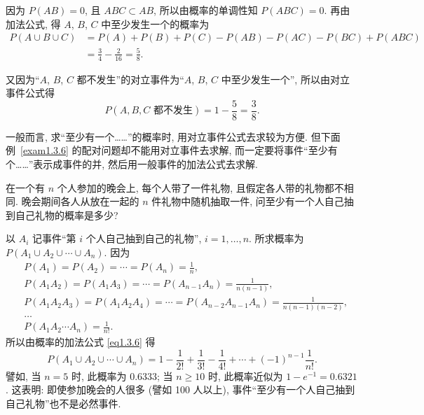 \begin{solution}
  因为 $P (AB) = 0$,
  且 $ABC \subset AB$,
  所以由概率的单调性知 $P (ABC) = 0$.
  再由加法公式,
  得 $A$, $B$, $C$ 中至少发生一个的概率为
  \begin{align*}
    P (A \cup B \cup C)
    &= P (A) + P (B) + P (C) - P (AB) - P (AC) - P (BC) + P (ABC)\\
    &= \frac{3}{4} - \frac{2}{16} = \frac{5}{8}.
  \end{align*}

  又因为“$A$, $B$, $C$ 都不发生”的对立事件为“$A$, $B$, $C$ 中至少发生一个”,
  所以由对立事件公式得
  \[
    P (A, B, C \text{ 都不发生}) = 1 - \frac{5}{8} = \frac{3}{8}.
  \]
\end{solution}

一般而言,
求“至少有一个……”的概率时,
用对立事件公式去求较为方便.
但下面例~\ref{exam1.3.6} 的配对问题却不能用对立事件去求解,
而一定要将事件“至少有个……”表示成事件的并,
然后用一般事件的加法公式去求解.

\begin{example}[配对问题]\label{exam1.3.6}
  在一个有 $n$ 个人参加的晚会上,
  每个人带了一件礼物,
  且假定各人带的礼物都不相同.
  晚会期间各人从放在一起的 $n$ 件礼物中随机抽取一件,
  问至少有一个人自己抽到自己礼物的概率是多少?
\end{example}

\begin{solution}
  以 $A_i$ 记事件“第 $i$ 个人自己抽到自己的礼物”,
  $i=1,\dotsc,n$.
  所求概率为 $P(A_1 \cup A_2 \cup \dotsb \cup A_n)$.
  因为
  \begin{align*}
    & P(A_1) = P(A_2) = \dotsb = P(A_n) =\frac{1}{n},\\
    & P(A_1 A_2) = P(A_1 A_3) = \dotsb = P(A_{n-1} A_n) = \frac{1}{n (n-1)},\\
    & P(A_1 A_2 A_3) = P(A_1 A_2 A_4) = \dotsb = P(A_{n-2} A_{n-1} A_n) = \frac{1}{n (n-1) (n-2)},\\
    & \ldots\\
    & P(A_1 A_2 \dotsb A_n) = \frac{1}{n!}.
  \end{align*}
  所以由概率的加法公式 \eqref{eq1.3.6} 得
  \[
    P(A_1 \cup A_2 \cup \dotsb \cup A_n) = 1 - \frac{1}{2!} + \frac{1}{3!} - \frac{1}{4!} + \dotsb + (-1)^{n-1} \frac{1}{n!}.
  \]
  譬如,
  当 $n=5$ 时,
  此概率为 \num{0.6333};
  当 $n \ge 10$ 时,
  此概率近似为 $1 - e^{-1} = 0.6321$.
  这表明:
  即使参加晚会的人很多 (譬如 100 人以上),
  事件“至少有一个人自己抽到自己礼物”也不是必然事件.
\end{solution}


